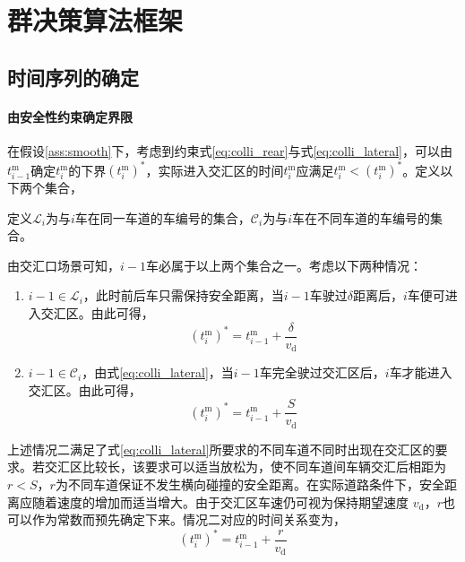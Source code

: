\section{群决策算法框架}
\subsection{时间序列的确定}
\label{ssec:time_series}
\paragraph{由安全性约束确定界限}
在假设\ref{ass:smooth}下，考虑到约束式\eqref{eq:colli_rear}与式\eqref{eq:colli_lateral}，可以由$t_{i-1}^\mathrm{m}$确定$t_i^\mathrm{m}$的下界$(t_i^\mathrm{m})^*$，实际进入交汇区的时间$t_i^\mathrm{m}$应满足$t_i^\mathrm{m} < (t_i^\mathrm{m})^*$。定义以下两个集合，
\begin{definition}
定义$\mathcal{L}_i$为与$i$车在同一车道的车编号的集合，$\mathcal{C}_i$为与$i$车在不同车道的车编号的集合。
\end{definition}
由交汇口场景可知，$i-1$车必属于以上两个集合之一。考虑以下两种情况：
\begin{enumerate}[label=(\arabic*)]
\item $i-1\in \mathcal{L}_i$，此时前后车只需保持安全距离，当$i-1$车驶过$\delta$距离后，$i$车便可进入交汇区。由此可得，
\begin{equation}
(t_i^\mathrm{m})^*=t_{i-1}^\mathrm{m} + \frac{\delta}{v_\mathrm{d}}
\label{eq:t_case1}
\end{equation}
\item $i-1\in \mathcal{C}_i$，由式\eqref{eq:colli_lateral}，当$i-1$车完全驶过交汇区后，$i$车才能进入交汇区。由此可得，
\begin{equation}
(t_i^\mathrm{m})^*=t_{i-1}^\mathrm{m} + \frac{S}{v_\mathrm{d}}
\label{eq:t_case2}
\end{equation}
\end{enumerate}

上述情况二满足了式\eqref{eq:colli_lateral}所要求的不同车道不同时出现在交汇区的要求。若交汇区比较长，该要求可以适当放松为，使不同车道间车辆交汇后相距为 $r < S$，$r$为不同车道保证不发生横向碰撞的安全距离。在实际道路条件下，安全距离应随着速度的增加而适当增大。由于交汇区车速仍可视为保持期望速度 $v_\mathrm{d}$，$r$也可以作为常数而预先确定下来。情况二对应的时间关系变为，
\begin{equation}
(t_i^\mathrm{m})^*=t_{i-1}^\mathrm{m} + \frac{r}{v_\mathrm{d}}
\label{eq:t_case2r}
\end{equation}


